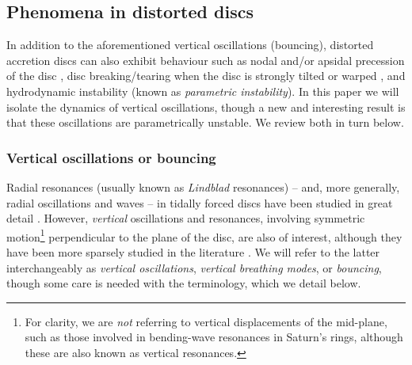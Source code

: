 \documentclass[fleqn,usenatbib]{mnras}
\begin{document}
\subsection{Phenomena in distorted discs}
In addition to the aforementioned vertical oscillations (bouncing), distorted accretion discs can also exhibit behaviour such as nodal and/or apsidal precession of the disc \citep{tremaine2023dynamics, bardeen1975lense, deng2022non, lubow1991model, ogilvie2001}, disc breaking/tearing when the disc is strongly tilted or warped \citep{lodato2010diffusive, nixon2012broken, tremaine2014dynamics, raj2021disk, drewes2021dynamics, liska2021disc, kaaz2023nozzle, young2023conditions, nealon2022bardeen}, and hydrodynamic instability (known as \textit{parametric instability}). In this paper we will isolate the dynamics of vertical oscillations, though a new and interesting result is that these oscillations are parametrically unstable. We review both in turn below.


\subsubsection{Vertical oscillations or bouncing}
\label{SECTION_INTRO_VerticalOscillations}
Radial resonances (usually known as \textit{Lindblad} resonances) -- and, more generally, radial oscillations and waves -- in tidally forced discs have been studied in great detail \citep{goldreich1979excitation, 1987Icar...69..157M, artymowicz1994dynamics, nixon2015resonances, lubow2015tidal, armitage2022lecture, ju2016global}. However, \textit{vertical} oscillations and resonances, involving symmetric motion\footnote{For clarity, we are \textit{not} referring to vertical displacements of the mid-plane, such as those involved in bending-wave resonances in Saturn's rings, although these are also known as vertical resonances.} perpendicular to the plane of the disc, are also of interest, although they have been more sparsely studied in the literature \citep{lubow1981vertically, stehle1999hydrodynamics, stehle1999CVsimulations, ogilvie2002non, fairbairn2021non}. We will refer to the latter interchangeably as \textit{vertical oscillations}, \textit{vertical breathing modes}, or \textit{bouncing}, though some care is needed with the terminology, which we detail below.
\end{document}
